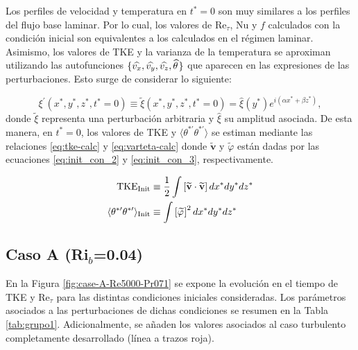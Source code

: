 Los perfiles de velocidad y temperatura en $t^*=0$ son muy similares a los perfiles del flujo base laminar.  Por lo cual, los valores de Re$_{\tau}$, Nu y $f$ calculados con la condición inicial son equivalentes a los calculados en el régimen laminar. Asimismo, los valores de TKE y la varianza de la temperatura se aproximan utilizando las autofunciones $\lbrace \widehat{v_x}, \widehat{v_y}, \widehat{v_z}, \widehat{\theta} \hspace{0.3mm} \rbrace$ que aparecen en las expresiones de las perturbaciones. Esto surge de considerar lo siguiente: 

$$\xi^{\prime} (x^*,y^*,z^*,t^* = 0) \equiv \widetilde{\xi}(x^*,y^*,z^*,t^*=0) =  \widehat{\xi}(y^*) e^{i (\alpha x^* + \beta z^*)} , $$
donde $\widetilde{\xi}$ representa una perturbación arbitraria y $\widehat{\xi}$ su amplitud asociada. De esta manera, en $t^*=0$, los valores de TKE y $\langle \theta^{* \prime} \theta^{* \prime} \rangle$ se estiman mediante las relaciones \ref{eq:tke-calc} y \ref{eq:varteta-calc} donde $\widetilde{\mathbf{v}}$ y $\widetilde{\varphi}$ están dadas por las ecuaciones \ref{eq:init_con_2} y \ref{eq:init_con_3}, respectivamente.

\begin{align}
\text{TKE}_{\text{Init}} &\equiv \frac{1}{2} \int \left[ \widetilde{\mathbf{v}} \cdot \widetilde{\mathbf{v}} \right] dx^* dy^* dz^* 
\label{eq:tke-calc}\\
\langle \theta^{* \prime} \theta^{* \prime} \rangle_{\text{Init}}  &\equiv \int \left[ \widetilde{\varphi} \hspace{0.2mm} \right]^2 dx^* dy^* dz^* 
\label{eq:varteta-calc}
\end{align}  

\newpage

\subsection{Caso A (Ri$_b$=0.04)}

En la Figura \ref{fig:case-A-Re5000-Pr071} se expone la evolución en el tiempo de TKE y Re$_{\tau}$ para las distintas condiciones iniciales consideradas. Los parámetros asociados a las perturbaciones de dichas condiciones se resumen en la Tabla \ref{tab:grupo1}. Adicionalmente, se añaden los valores asociados al caso turbulento completamente desarrollado (línea a trazos roja).  

